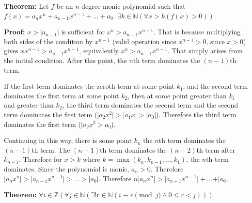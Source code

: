 \setcounter{enumii}{10}
\item \textbf{Theorem:} Let \(f\) be an \(n\)-degree monic polynomial such that \(f(x) = a_n x^n + a_{n-1} x^{n-1} + \dots + a_0 \). \(\exists k \in \mathbb N (\forall x > k (f(x) > 0))\).

\textbf{Proof:} \(x > \lvert a_{n-1} \rvert\) is sufficient for \(x^n > a_{n-1} x^{n-1}\). That is because multiplying both sides of the condition by \(x^{n-1}\) (valid operation since \(x^{n-1}>0\), since \(x>0\)) gives \(x x^{n-1} > a_{n-1} x^{n-1}\), equivalently \(x^n  > a_{n-1} x^{n-1}\). That simply arises from the initial condition. After this point, the \(n\)th term dominates the \((n-1)\)th term.

If the first term dominates the zeroth term at some point \(k_1\), and the second term dominates the first term at some point \(k_2\), then at some point greater than \(k_1\) and greater than \(k_2\), the third term dominates the second term and the second term dominates the first term (\(\lvert a_2 x^2 \rvert > \lvert a_1 x \rvert > \lvert a_0 \rvert\)). Therefore the third term dominates the first term (\(\lvert a_2 x^2 > a_0\)). 

Continuing in this way, there is some point \(k_n\) the \(n\)th term dominates the \((n-1)\)th term. The \((n-1)\)th term dominates the \((n-2)\)th term after \(k_{n-1}\). Therefore for \(x > k\) where \(k = \max(k_n, k_{n-1}, \dots, k_1)\), the \(n\)th term dominates. Since the polynomial is monic, \(a_n > 0\). Therefore \(\lvert a_n x^n \rvert > \lvert a_{n-1} x^{n-1} \rvert > \dots > \rvert a_0 \lvert\). Therefore \(n \lvert a_n x^n \rvert > \lvert a_{n-1} x^{n-1} \rvert + \dots + \rvert a_0 \lvert\). 

\setcounter{enumii}{13}
\item \textbf{Theorem:} \(\forall i \in \mathbb Z (\forall j \in \mathbb N (\exists ! r \in \mathbb N (i \equiv r \pmod j \wedge 0 \leq r < j)))\)

